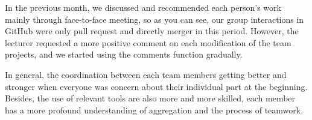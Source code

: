 \noindent In the previous month, we discussed and recommended each person's work mainly through face-to-face meeting, so as you can see, our group interactions in GitHub were only pull request and directly merger in this period. However, the lecturer requested a more positive comment on each modification of the team projects, and we started using the comments function gradually.
\vspace{0.2cm}

\noindent In general, the coordination between each team members getting better and stronger when everyone was concern about their individual part at the beginning. Besides, the use of relevant tools are also more and more skilled, each member has a more profound understanding of aggregation and the process of teamwork.
